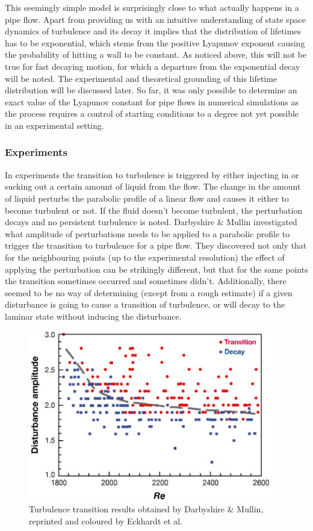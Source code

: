 \documentclass[11pt,a4paper]{article}
\begin{document}
This seemingly simple model is surprisingly close to what actually happens in a pipe flow.
Apart from providing us with an intuitive understanding of state space dynamics of turbulence and its decay it implies that the distribution of lifetimes has to be exponential, which stems from the positive Lyapunov exponent causing the probability of hitting a wall to be constant.
As noticed above, this will not be true for fast decaying motion, for which a departure from the exponential decay will be noted.
The experimental and theoretical grounding of this lifetime distribution will be discussed later.
So far, it was only possible to determine an exact value of the Lyapunov constant for pipe flows in numerical simulations\cite{Faisst04} as the process requires a control of starting conditions to a degree not yet possible in an experimental setting.


\subsubsection{Experiments}
In experiments the transition to turbulence is triggered by either injecting in or sucking out a certain amount of liquid from the flow.
The change in the amount of liquid perturbs the parabolic profile of a linear flow and causes it either to become turbulent or not.
If the fluid doesn't become turbulent, the perturbation decays and no persistent turbulence is noted.
Darbyshire \& Mullin\cite{Darbyshire95} investigated what amplitude of perturbations needs to be applied to a parabolic profile to trigger the transition to turbulence for a pipe flow.
They discovered not only that for the neighbouring points (up to the experimental resolution) the effect of applying the perturbation can be strikingly different, but that for the same points the transition sometimes occurred and sometimes didn't.
Additionally, there seemed to be no way of determining (except from a rough estimate) if a given disturbance is going to cause a transition of turbulence, or will decay to the laminar state without inducing the disturbance.

\begin{figure}[h]
    \centering
    \includegraphics[width=0.95\textwidth]{darbyshire95.png}
    \caption{Turbulence transition results obtained by Darbyshire \& Mullin\cite{Darbyshire95}, reprinted and coloured by Eckhardt et al.\cite{Eckhardt07}}\label{img:darbyshire_plot}
\end{figure}
\end{document}
